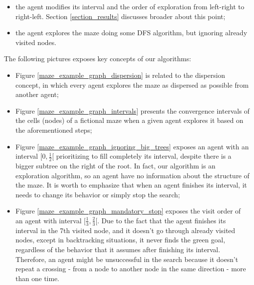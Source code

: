 \begin{itemize}
	\begin{itemize}

	\item the agent modifies its interval and the order of exploration from left-right to right-left. Section \ref{section_results} discusses broader about this point;
	
	\item the agent explores the maze doing some DFS algorithm, but ignoring already visited nodes.
	
	\end{itemize}
\end{itemize}

The following pictures exposes key concepts of our algorithms:

\begin{itemize}

\item Figure \ref{maze_example_graph_dispersion} is related to the dispersion concept, in which every agent explores the maze as dispersed as possible from another agent;
	
\item Figure \ref{maze_example_graph_intervals} presents the convergence intervals of the cells (nodes) of a fictional maze when a given agent explores it based on the aforementioned steps;

\item Figure \ref{maze_example_graph_ignoring_big_trees} exposes an agent with an interval $[0,\frac{1}{2}[$ prioritizing to fill completely its interval, despite there is a bigger subtree on the right of the root. In fact, our algorithm is an exploration algorithm, so an agent have no information about the structure of the maze. It is worth to emphasize that when an agent finishes its interval, it needs to change its behavior or simply stop the search;

\item Figure \ref{maze_example_graph_mandatory_stop} exposes the visit order of an agent with interval $[\frac{1}{3},\frac{2}{3}[$. Due to the fact that the agent finishes its interval in the 7th visited node, and it doesn't go through already visited nodes, except in backtracking situations, it never finds the green goal, regardless of the behavior that it assumes after finishing its interval. Therefore, an agent might be unsuccessful in the search because it doesn't repeat a crossing - from a node to another node in the same direction - more than one time.
	
\end{itemize}

